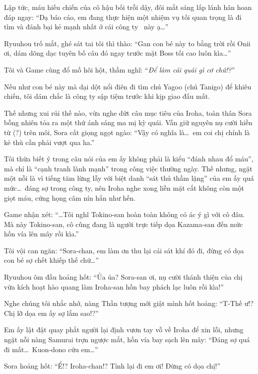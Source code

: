 \documentclass[../main.tex]{subfiles}
\begin{document}
Lập tức, máu hiếu chiến của cô hậu bối trỗi dậy, đôi mắt sáng lấp lánh hân hoan đáp ngay: ``Dạ báo cáo, em đang thực hiện một nhiệm vụ tối quan trọng là đi tìm và đánh bại kẻ mạnh nhất ở cái công ty \hll\ này ạ\dots''

Ryuuhou trố mắt, ghé sát tai tôi thì thào: ``Gan con bé này to bằng trời rồi Onii ơi, dám dõng dạc tuyên bố câu đó ngay trước mặt Boss tối cao luôn kìa\dots''

Tôi và Game cùng đổ mồ hôi hột, thầm nghĩ: ``\textit{Để làm cái quái gì cơ chứ!?}''

Nếu như con bé này mà dại dột nổi điên đi tìm chú Yagoo (chú Tanigo) để khiêu chiến, tôi dám chắc là công ty sập tiệm trước khi kịp giao đấu mất.

Thế nhưng xui rủi thế nào, vừa nghe dứt câu mục tiêu của Iroha, toàn thân Sora bỗng nhiên tỏa ra một thứ ánh sáng ma mị kỳ quái. Vẫn giữ nguyên nụ cười hiền từ (?) trên môi, Sora cất giọng ngọt ngào: ``Vậy có nghĩa là\dots\ em coi chị chính là kẻ thù cần phải vượt qua ha.''


Tôi thừa biết ý trong câu nói của em ấy không phải là kiểu ``đánh nhau đổ máu'', mà chỉ là ``cạnh tranh lành mạnh'' trong công việc thường ngày. Thế nhưng, ngặt một nỗi là vì tiếng tăm lừng lẫy với biệt danh ``sát thủ thầm lặng'' của em ấy quá mức\dots\ đáng sợ trong công ty, nên Iroha nghe xong liền mặt cắt không còn một giọt máu, cứng họng câm nín hẳn như hến.

Game nhận xét: ``\dots Tôi nghĩ Tokino-san hoàn toàn không có ác ý gì với cô đâu. Mà này Tokino-san, cô cũng đang là người trực tiếp dọa Kazama-san đến mức hồn vía lên mây rồi kìa.''

Tôi vội can ngăn: ``Sora-chan, em làm ơn thu lại cái sát khí đó đi, đừng có dọa con bé sợ chết khiếp thế chứ\dots''

Ryuuhou ôm đầu hoảng hốt: ``Ủa ủa? Sora-san ơi, nụ cười thánh thiện của chị vừa kích hoạt hào quang làm Iroha-san hồn bay phách lạc luôn rồi kìa!''

Nghe chúng tôi nhắc nhở, nàng Thần tượng mới giật mình hốt hoảng: ``T-Thế ư!? Chị lỡ dọa em ấy sợ lắm sao!?''

Em ấy lật đật quay phắt người lại định vươn tay vỗ về Iroha để xin lỗi, nhưng ngặt nỗi nàng Samurai trợn ngược mắt, hồn vía bay sạch lên mây: ``Đáng sợ quá đi mất\dots\ Kuon-dono cứu em\dots''


Sora hoảng hốt: ``Ể!? Iroha-chan!? Tỉnh lại đi em ơi! Đừng có dọa chị!''
\end{document}
